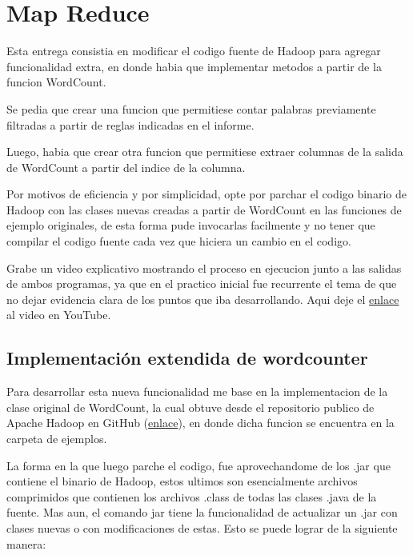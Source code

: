 \documentclass[12pt,letterpaper,twoside]{article}
\begin{document}

\section{Map Reduce}

\noindent
Esta entrega consistia en modificar el codigo fuente de Hadoop para agregar funcionalidad extra, en donde habia que implementar metodos a partir de la funcion WordCount.

\noindent
Se pedia que crear una funcion que permitiese contar palabras previamente filtradas a partir de reglas indicadas en el informe.

\noindent
Luego, habia que crear otra funcion que permitiese extraer columnas de la salida de WordCount a partir del indice de la columna.

\noindent
Por motivos de eficiencia y por simplicidad, opte por parchar el codigo binario de Hadoop con las clases nuevas creadas a partir de WordCount en las funciones
de ejemplo originales, de esta forma pude invocarlas facilmente y no tener que compilar el codigo fuente cada vez que hiciera un cambio en el codigo.

\noindent
Grabe un video explicativo mostrando el proceso en ejecucion junto a las salidas de ambos programas, ya que en el practico inicial fue recurrente el tema de que no
dejar evidencia clara de los puntos que iba desarrollando. Aqui deje el {\color{blue}\href{https://www.youtube.com/watch?v=UVJUVDU4luk}{enlace}} al video en YouTube.

\newpage

\subsection{Implementación extendida de wordcounter}

\noindent
Para desarrollar esta nueva funcionalidad me base en la implementacion de la clase original de WordCount, la cual obtuve desde el repositorio publico de Apache Hadoop
en GitHub ({\color{blue}\href{https://github.com/apache/hadoop}{enlace}}), en donde dicha funcion se encuentra en la carpeta de ejemplos.

\noindent
La forma en la que luego parche el codigo, fue aprovechandome de los .jar que contiene el binario de Hadoop, estos ultimos son esencialmente
archivos comprimidos que contienen los archivos .class de todas las clases .java de la fuente. Mas aun, el comando jar tiene la funcionalidad
de actualizar un .jar con clases nuevas o con modificaciones de estas. Esto se puede lograr de la siguiente manera:
\end{document}
